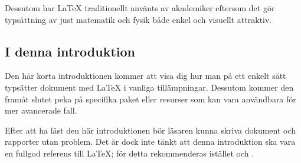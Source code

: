\documentclass[swe,12pt]{skrapport}
\makeatletter
\let\@oldLaTeX\LaTeX
\def\LaTeX{\texorpdfstring{\@oldLaTeX}{LaTeX}}
\makeatother
\begin{document}
	Dessutom har \LaTeX{} traditionellt använts av akademiker eftersom det gör 
	typsättning av just matematik och fysik både enkel och visuellt attraktiv. 
	
	\subsection*{I denna introduktion}
	Den här korta introduktionen kommer att visa dig hur man på ett enkelt
	sätt typsätter dokument med \LaTeX{} i vanliga tillämpningar.
	Dessutom kommer den framåt slutet peka på specifika paket eller
	resurser som kan vara användbara för mer avancerade fall.
	
	Efter att ha läst den här introduktionen bör läsaren kunna skriva
	dokument och rapporter utan problem. Det är dock inte tänkt att denna
	introduktion ska vara en fullgod referens till \LaTeX; för detta
	rekommenderas istället  och
	.
	
\end{document}
